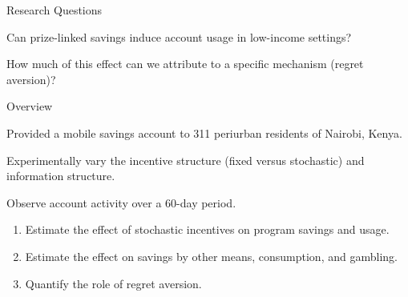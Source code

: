 \documentclass[aspectratio=169]{beamer}
\newenvironment{wideitemize}{\itemize\addtolength{\itemsep}{10pt}}{\enditemize}
\newenvironment{wideenumerate}{\enumerate\addtolength{\itemsep}{10pt}}{\endenumerate}
\begin{document}
\begin{frame}{Research Questions}

	\begin{wideenumerate}

		\item Can prize-linked savings induce account usage in low-income settings?
		\item How much of this effect can we attribute to a specific mechanism (regret aversion)?


	\end{wideenumerate}

\end{frame}

\begin{frame}{Overview}

	\begin{wideitemize}

		\item Provided a mobile savings account to 311 periurban residents of Nairobi, Kenya.
		\item Experimentally vary the incentive structure (fixed versus stochastic) and information structure.
		\item Observe account activity over a 60-day period.

		\begin{enumerate}
			\item Estimate the effect of stochastic incentives on program savings and usage.
			\item Estimate the effect on savings by other means, consumption, and gambling.
			\item Quantify the role of regret aversion.
		\end{enumerate}

	\end{wideitemize}

\end{frame}
\end{document}
